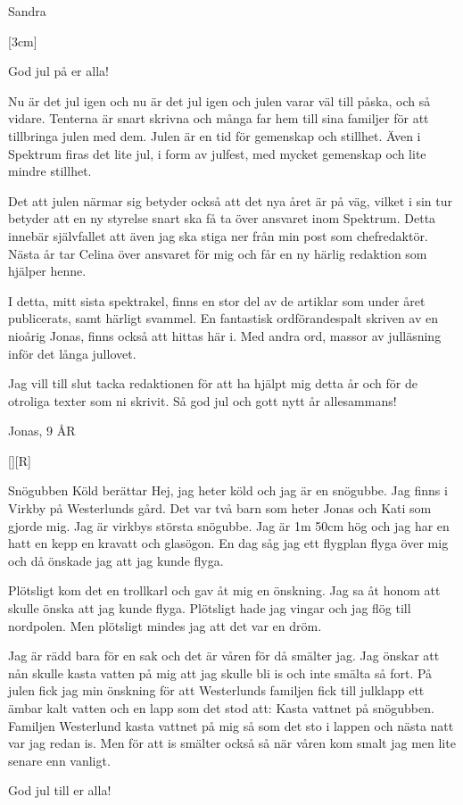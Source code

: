 \documentclass{spektraklet}
\begin{document}
\begin{ledaren}{Sandra}

[3cm]

God jul på er alla!

Nu är det jul igen och nu är det jul igen och julen varar väl till påska, och så vidare. Tenterna är snart skrivna och många far hem till sina familjer för att tillbringa julen med dem. Julen är en tid för gemenskap och stillhet. Även i Spektrum firas det lite jul, i form av julfest, med mycket gemenskap och lite mindre stillhet.

Det att julen närmar sig betyder också att det nya året är på väg, vilket i sin tur betyder att en ny styrelse snart ska få ta över ansvaret inom Spektrum. Detta innebär självfallet att även jag ska stiga ner från min post som chefredaktör. Nästa år tar Celina över ansvaret för mig och får en ny härlig redaktion som hjälper henne.

I detta, mitt sista spektrakel, finns en stor del av de artiklar som under året publicerats, samt härligt svammel. En fantastisk ordförandespalt skriven av en nioårig Jonas, finns också att hittas här i. Med andra ord, massor av julläsning inför det långa jullovet.

Jag vill till slut tacka redaktionen för att ha hjälpt mig detta år och för de otroliga texter som ni skrivit. Så god jul och gott nytt år allesammans!

\end{ledaren}




\begin{ordforandespalten}{Jonas, 9 ÅR}

[][R]

Snögubben Köld berättar
Hej, jag heter köld och jag är en snögubbe. Jag finns i Virkby på Westerlunds gård. Det var två barn som heter Jonas och Kati som gjorde mig. Jag är virkbys största snögubbe. Jag är 1m 50cm hög och jag har en hatt en kepp en kravatt och glasögon. En dag såg jag ett flygplan flyga över mig och då önskade jag att jag kunde flyga.

Plötsligt kom det en trollkarl och gav åt mig en önskning. Jag sa åt honom att skulle önska att jag kunde flyga. Plötsligt hade jag vingar och jag flög till nordpolen. Men plötsligt mindes jag att det var en dröm.

Jag är rädd bara för en sak och det är våren för då smälter jag. Jag önskar att nån skulle kasta vatten på mig att jag skulle bli is och inte smälta så fort. På julen fick jag min önskning för att Westerlunds familjen fick till julklapp ett ämbar kalt vatten och en lapp som det stod att: Kasta vattnet på snögubben. Familjen Westerlund kasta vattnet på mig så som det sto i lappen och nästa natt var jag redan is. Men för att is smälter också så när våren kom smalt jag men lite senare enn vanligt.

God jul till er alla!
	
\end{ordforandespalten}
\end{document}
